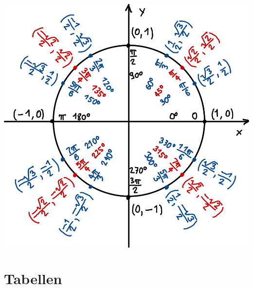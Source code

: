 \documentclass[a4paper,10pt]{article}
\begin{document}
\begin{center}
  \includegraphics[width=\linewidth]{Einheitskreis.png}
  
\end{center}

\section{Tabellen}
\end{document}
